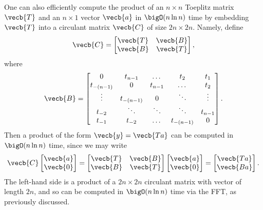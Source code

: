 One can also efficiently compute the product of an $n \times n$ Toeplitz matrix $\vecb{T}$ and an $n \times 1$ vector $\vecb{a}$ in $\bigO(n \ln n)$ time by embedding $\vecb{T}$ into a circulant matrix $\vecb{C}$ of size $2n \times 2n$. Namely, define
\begin{equation*}
	\vecb{C} =
	\begin{bmatrix}
		\vecb{T} & \vecb{B} \\
		\vecb{B} & \vecb{T}
	\end{bmatrix},
\end{equation*}
where
\begin{equation*}
	\vecb{B} =
	\begin{bmatrix}
		0          & t_{n-1}    & \dots   & t_2        & t_1     \\
		t_{-(n-1)} & 0          & t_{n-1} & \dots      & t_2     \\
		\vdots     & t_{-(n-1)} & 0       & \ddots     & \vdots  \\
		t_{-2}     & \ddots     & \ddots  & \ddots     & t_{n-1} \\
		t_{-1}     & t_{-2}     & \dots   & t_{-(n-1)} & 0
	\end{bmatrix}.
\end{equation*}
Then a product of the form $\vecb{y} = \vecb{Ta}$ can be computed in $\bigO(n \ln n)$ time, since we may write
\begin{equation*}
	\vecb{C}
	\begin{bmatrix}
		\vecb{a} \\ \vecb{0}
	\end{bmatrix}
	=
	\begin{bmatrix}
		\vecb{T} & \vecb{B} \\
		\vecb{B} & \vecb{T}
	\end{bmatrix}
	\begin{bmatrix}
		\vecb{a} \\ \vecb{0}
	\end{bmatrix}
	=
	\begin{bmatrix}
		\vecb{Ta} \\ \vecb{Ba}
	\end{bmatrix}.
\end{equation*}
The left-hand side is a product of a $2n \times 2n$ circulant matrix with vector of length $2n$, and so can be computed in $\bigO(n \ln n)$ time via the FFT, as previously discussed.

